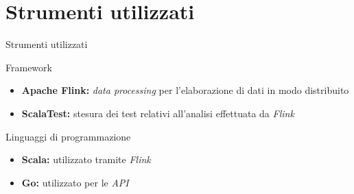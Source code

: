 \documentclass{beamer}
\begin{document}
	\section{Strumenti utilizzati}

	\begin{frame}{Strumenti utilizzati}
		\begin{block}{Framework}
			\begin{itemize}
				\item \textbf{Apache Flink:} \textit{data processing} per l'elaborazione di dati in modo distribuito \vspace{.5em}
				\item \textbf{ScalaTest:} stesura dei test relativi all'analisi effettuata da \textit{Flink} \vspace{.5em}
			\end{itemize}
		\end{block}
		
		\begin{block}{Linguaggi di programmazione}
			\begin{itemize}
				\item \textbf{Scala:} utilizzato tramite \textit{Flink} \vspace{.5em}
				\item \textbf{Go:} utilizzato per le \textit{API} \vspace{.5em}
			\end{itemize}
		\end{block}
	\end{frame}
	
\end{document}
